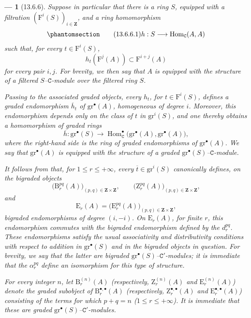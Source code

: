 \documentclass[oneside]{amsart}
\theoremstyle{ega-env-style}
\newtheorem*{env}{---}
\theoremstyle{ega-thm-env-style}
\theoremstyle{ega-defn-env-style}
\def\bb{\mathbf}                    %
\def\cat{\mathtt}                   %
\def\leq{\leqslant}                 %
\def\Hom{\operatorname{Hom}}
\newcommand{\oldpage}[2][]{{\marginnote{\normalfont{\textbf{#1}~|~#2}}}\ignorespaces}
\let\EGAOriginalLabel\label
\renewcommand{\label}[1]{\phantomsection\EGAOriginalLabel{#1}}
\begin{document}
\begin{env}[13.6.6]
\label{0.13.6.6}
Suppose in particular that there is a ring $S$, equipped with a
\emph{filtration} $(\mathrm{F}^i(S))_{i\in\bb{Z}}$, and a ring
homomorphism
\begin{equation}
\label{0.13.6.6.1}
\tag{13.6.6.1}
  h:S\longrightarrow\Hom_{\cat{C}}(A,A)
\end{equation}
\oldpage[0\textsubscript{III}]{75}
such that, for every $t\in\mathrm{F}^i(S)$,
\[
  h_t(\mathrm{F}^j(A))
  \subset
  \mathrm{F}^{i+j}(A)
\]
for every pair $i,j$.
For brevity, we then say that $A$ is equipped with the structure of a
\emph{filtered $S$--$\cat{C}$-module} over the filtered ring $S$.

Passing to the associated graded objects, every $h_t$, for
$t\in\mathrm{F}^i(S)$, defines a graded endomorphism
$\overline{h}_t$ of $\mathrm{gr}^\bullet(A)$, homogeneous of degree
$i$.
Moreover, this endomorphism depends only on the class of $t$ in
$\mathrm{gr}^i(S)$, and one thereby obtains a homomorphism of
\emph{graded rings}
\[
  \overline{h}:
  \mathrm{gr}^\bullet(S)
  \longrightarrow
  \Hom_{\cat{C}}^\bullet
  \bigl(\mathrm{gr}^\bullet(A),\mathrm{gr}^\bullet(A)\bigr),
\]
where the right-hand side is the ring of graded endomorphisms of
$\mathrm{gr}^\bullet(A)$.
We say that $\mathrm{gr}^\bullet(A)$ is equipped with the structure
of a \emph{graded $\mathrm{gr}^\bullet(S)$--$\cat{C}$-module}.

It follows from  that, for
$1\leq r\leq+\infty$, every
$\overline{t}\in\mathrm{gr}^i(S)$ canonically defines, on the
bigraded objects
\[
  \bigl(\mathrm{B}_r^{pq}(A)\bigr)_{(p,q)\in\bb{Z}\times\bb{Z}},
  \qquad
  \bigl(\mathrm{Z}_r^{pq}(A)\bigr)_{(p,q)\in\bb{Z}\times\bb{Z}},
\]
and
\[
  \mathrm{E}_r(A)
  =
  \bigl(\mathrm{E}_r^{pq}(A)\bigr)_{(p,q)\in\bb{Z}\times\bb{Z}},
\]
bigraded endomorphisms of degree $(i,-i)$.
On $\mathrm{E}_r(A)$, for finite $r$, this endomorphism commutes with
the bigraded endomorphism defined by the $d_r^{pq}$.
These endomorphisms satisfy the usual associativity and
distributivity conditions with respect to addition in
$\mathrm{gr}^\bullet(S)$ and in the bigraded objects in question.
For brevity, we say that the latter are
\emph{bigraded $\mathrm{gr}^\bullet(S)$--$\cat{C}'$-modules};
it is immediate that the $\alpha_r^{pq}$ define an isomorphism for
this type of structure.

For every integer $n$, let $\mathrm{B}_r^{(n)}(A)$
(respectively, $\mathrm{Z}_r^{(n)}(A)$ and
$\mathrm{E}_r^{(n)}(A)$) denote the graded subobject of
$\mathrm{B}_r^{\bullet,\bullet}(A)$
(respectively, $\mathrm{Z}_r^{\bullet,\bullet}(A)$ and
$\mathrm{E}_r^{\bullet,\bullet}(A)$) consisting of the terms for
which $p+q=n$ ($1\leq r\leq+\infty$).
It is immediate that these are
\emph{graded $\mathrm{gr}^\bullet(S)$--$\cat{C}'$-modules}.


\end{env}
\end{document}
